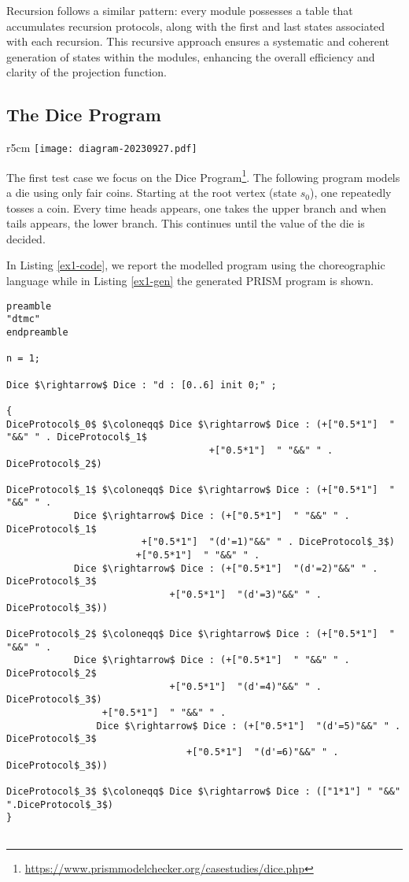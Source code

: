 Recursion follows a similar pattern: every module possesses a table that accumulates recursion protocols, along with the first and last states associated with each recursion. This recursive approach ensures a systematic and coherent generation of states within the modules, enhancing the overall efficiency and clarity of the projection function.

\subsection{The Dice Program}
\begin{wrapfigure}[10]{r}{5cm}
	\texttt{[image: diagram-20230927.pdf]}	
\end{wrapfigure} 
 The first test case we focus on the Dice Program\footnote{\url{https://www.prismmodelchecker.org/casestudies/dice.php}}\cite{KY76}.
 The following program models a die using only fair coins. 
 Starting at the root vertex (state $s_0$), one repeatedly tosses a coin. Every time heads appears, one takes the upper branch and when tails appears, the lower branch. 
 This continues until the value of the die is decided.

In Listing \ref{ex1-code}, we report the modelled program using the choreographic language
while in Listing \ref{ex1-gen} the generated PRISM program is shown.


\begin{lstlisting}[style=chor-color,caption={Choreographic language for the Dice Program.},captionpos=b,label={ex1-code}]
preamble
"dtmc"
endpreamble

n = 1;

Dice $\rightarrow$ Dice : "d : [0..6] init 0;" ;

{
DiceProtocol$_0$ $\coloneqq$ Dice $\rightarrow$ Dice : (+["0.5*1"]  " "&&" " . DiceProtocol$_1$
                                    +["0.5*1"]  " "&&" " .  DiceProtocol$_2$)

DiceProtocol$_1$ $\coloneqq$ Dice $\rightarrow$ Dice : (+["0.5*1"]  " "&&" " . 
 			Dice $\rightarrow$ Dice : (+["0.5*1"]  " "&&" " . DiceProtocol$_1$
           	 		 	+["0.5*1"]  "(d'=1)"&&" " . DiceProtocol$_3$)
     				   +["0.5*1"]  " "&&" " .  
   			Dice $\rightarrow$ Dice : (+["0.5*1"]  "(d'=2)"&&" " . DiceProtocol$_3$
           	 		         +["0.5*1"]  "(d'=3)"&&" " . DiceProtocol$_3$))

DiceProtocol$_2$ $\coloneqq$ Dice $\rightarrow$ Dice : (+["0.5*1"]  " "&&" " . 
	 		Dice $\rightarrow$ Dice : (+["0.5*1"]  " "&&" " . DiceProtocol$_2$
	 	                	 +["0.5*1"]  "(d'=4)"&&" " . DiceProtocol$_3$)
	 			 +["0.5*1"]  " "&&" " . 
	    		Dice $\rightarrow$ Dice : (+["0.5*1"]  "(d'=5)"&&" " . DiceProtocol$_3$
	                     		+["0.5*1"]  "(d'=6)"&&" " . DiceProtocol$_3$))

DiceProtocol$_3$ $\coloneqq$ Dice $\rightarrow$ Dice : (["1*1"] " "&&" ".DiceProtocol$_3$)
}
	
\end{lstlisting}


